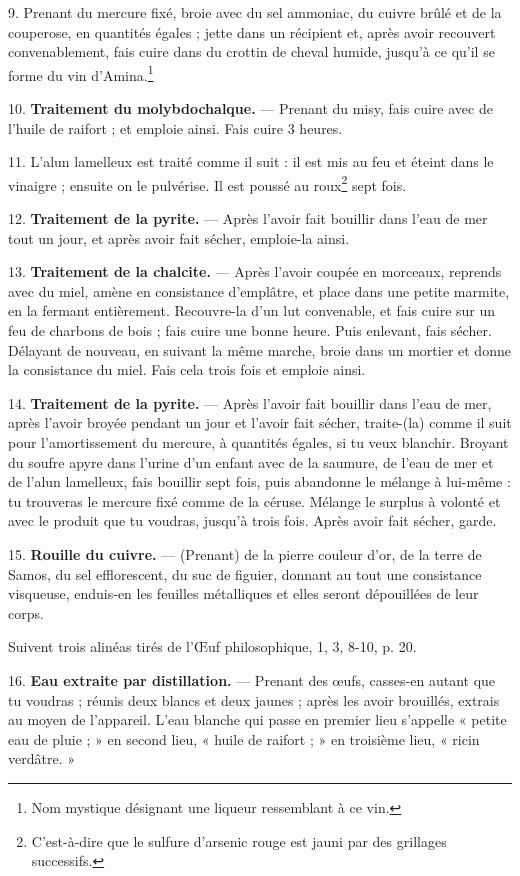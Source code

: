 \documentclass[a4paper, 11pt, oneside, polutonikogreek, french]{article}
\begin{document}
9. Prenant du mercure fixé, broie avec du sel ammoniac, du cuivre brûlé et de la couperose, en quantités égales ; jette dans un récipient et, après avoir recouvert convenablement, fais cuire dans du crottin de cheval humide, jusqu'à ce qu'il se forme du vin d'Amina.\footnote{Nom mystique désignant une liqueur ressemblant à ce vin.}

10. \textbf{Traitement du molybdochalque.} --- Prenant du misy, fais cuire avec de l'huile de raifort ; et emploie ainsi. Fais cuire 3 heures.

11. L'alun lamelleux est traité comme il suit : il est mis au feu et éteint dans le vinaigre ; ensuite on le pulvérise. Il est poussé au roux\footnote{C'est-à-dire que le sulfure d'arsenic rouge est jauni par des grillages successifs.} sept fois.

12. \textbf{Traitement de la pyrite.} --- Après l'avoir fait bouillir dans l'eau de mer tout un jour, et après avoir fait sécher, emploie-la ainsi.

13. \textbf{Traitement de la chalcite.} --- Après l'avoir coupée en morceaux, reprends avec du miel, amène en consistance d'emplâtre, et place dans une petite marmite, en la fermant entièrement. Recouvre-la d'un lut convenable, et fais cuire sur un feu de charbons de bois ; fais cuire une bonne heure. Puis enlevant, fais sécher. Délayant de nouveau, en suivant la même marche, broie dans un mortier et donne la consistance du miel. Fais cela trois fois et emploie ainsi.

14. \textbf{Traitement de la pyrite.} --- Après l'avoir fait bouillir dans l'eau de mer, après l'avoir broyée pendant un jour et l'avoir fait sécher, traite-(la) comme il suit pour l'amortissement du mercure, à quantités égales, si tu veux blanchir. Broyant du soufre apyre dans l'urine d'un enfant avec de la saumure, de l'eau de mer et de l'alun lamelleux, fais bouillir sept fois, puis abandonne le mélange à lui-même : tu trouveras le mercure fixé comme de la céruse. Mélange le surplus à volonté et avec le produit que tu voudras, jusqu'à trois fois. Après avoir fait sécher, garde.

15. \textbf{Rouille du cuivre.} --- (Prenant) de la pierre couleur d'or, de la terre de Samos, du sel efflorescent, du suc de figuier, donnant au tout une consistance visqueuse, enduis-en les feuilles métalliques et elles seront dépouillées de leur corps.

Suivent trois alinéas tirés de l'Œuf philosophique, 1, 3, 8-10, p. 20.

16. \textbf{Eau extraite par distillation.} --- Prenant des œufs, casses-en autant que tu voudras ; réunis deux blancs et deux jaunes ; après les avoir brouillés, extrais au moyen de l'appareil. L'eau blanche qui passe en premier lieu s'appelle « petite eau de pluie ; » en second lieu, « huile de raifort ; » en troisième lieu, « ricin verdâtre. »
\end{document}

